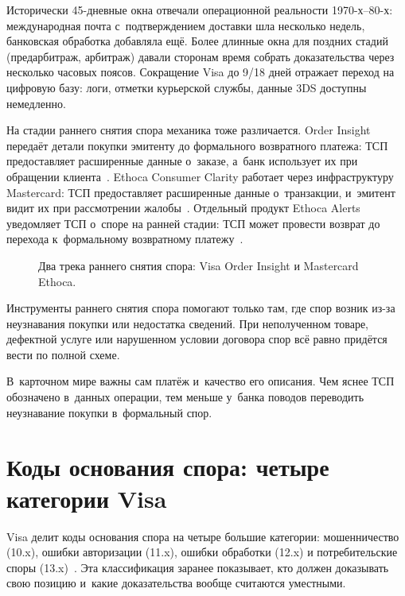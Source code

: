 Исторически 45-дневные окна отвечали операционной реальности
1970-х--80-х: международная почта с~подтверждением доставки
шла несколько недель, банковская обработка добавляла ещё.
Более длинные окна для поздних стадий (предарбитраж, арбитраж)
давали сторонам время собрать доказательства через несколько
часовых поясов. Сокращение Visa до 9/18 дней отражает переход
на цифровую базу: логи, отметки курьерской службы, данные 3DS
доступны немедленно.

На стадии раннего снятия спора механика тоже различается.
Order Insight передаёт детали покупки эмитенту до
формального возвратного платежа: ТСП предоставляет расширенные
данные о~заказе, а~банк использует их при обращении
клиента~\cite{visa-order-insight}.
Ethoca Consumer Clarity работает через инфраструктуру Mastercard:
ТСП предоставляет расширенные данные о~транзакции, и~эмитент
видит их при рассмотрении жалобы~\cite{mc-dispute-management}.
Отдельный продукт Ethoca Alerts уведомляет ТСП о~споре
на ранней стадии: ТСП может провести возврат до
перехода к~формальному возвратному платежу~\cite{mc-dispute-management}.

\begin{figure}[tbp]
  \centering
  \caption{Два трека раннего снятия спора: Visa Order Insight и Mastercard Ethoca.}\label{fig:vcr-vs-mc-flow}
\end{figure}

Инструменты раннего снятия спора помогают только там, где спор возник
из-за неузнавания покупки или недостатка сведений. При неполученном
товаре, дефектной услуге или нарушенном условии договора спор всё равно
придётся вести по полной схеме.

В~карточном мире важны сам платёж и~качество его описания. Чем яснее
ТСП обозначено в~данных операции, тем меньше у~банка
поводов переводить неузнавание покупки в~формальный спор.

\section{Коды основания спора: четыре категории Visa}\label{sec:disputes-reason-codes}

Visa делит коды основания спора на четыре большие категории:
мошенничество (10.x), ошибки авторизации (11.x), ошибки обработки
(12.x) и потребительские споры (13.x)~\cite{visa-core-rules}.
Эта классификация заранее показывает, кто должен доказывать свою
позицию и~какие доказательства вообще считаются уместными.

